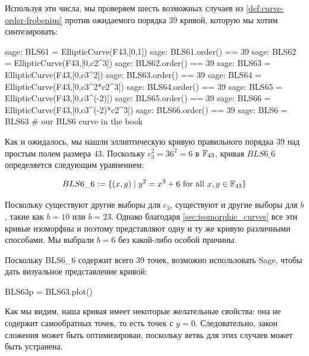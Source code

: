 Используя эти числа, мы проверяем шесть возможных случаев из \ref{def:curve-order-frobenius} против ожидаемого порядка $39$ кривой, которую мы хотим синтезировать:

\begin{sagecommandline}
sage: BLS61 = EllipticCurve(F43,[0,1])
sage: BLS61.order() == 39
sage: BLS62 = EllipticCurve(F43,[0,c2^3])
sage: BLS62.order() == 39
sage: BLS63 = EllipticCurve(F43,[0,c3^2])
sage: BLS63.order() == 39
sage: BLS64 = EllipticCurve(F43,[0,c3^2*c2^3])
sage: BLS64.order() == 39
sage: BLS65 = EllipticCurve(F43,[0,c3^(-2)])
sage: BLS65.order() == 39
sage: BLS66 = EllipticCurve(F43,[0,c3^(-2)*c2^3])
sage: BLS66.order() == 39
sage: BLS6 = BLS63 # our BLS6 curve in the book
\end{sagecommandline}
Как и ожидалось, мы нашли эллиптическую кривую правильного порядка $39$ над простым полем размера $43$. Поскольку $c_3^2=36^2=6$ в $\mathbb{F}_{43}$, кривая $BLS6\_6$ определяется следующим уравнением:

\begin{equation}
BLS6\_6 := \{(x,y)\;|\; y^2 = x^3 + 6 \text{ for all } x,y \in \mathbb{F}_{43}\}
\end{equation}

Поскольку существуют другие выборы для $c_3$, существуют и другие выборы для $b$, такие как $b=10$ или $b=23$. Однако благодаря \ref{sec:isomorphic_curves} все эти кривые изоморфны и поэтому представляют одну и ту же кривую различными способами. Мы выбрали $b=6$ без какой-либо особой причины.

Поскольку BLS6\_6 содержит всего $39$ точек, возможно использовать Sage, чтобы дать визуальное представление кривой:

\begin{sagesilent}
BLS63p = BLS63.plot()
\end{sagesilent}
\begin{center} 
\end{center}

Как мы видим, наша кривая имеет некоторые желательные свойства: она не содержит самообратных точек, то есть точек с $y=0$. Следовательно, закон сложения может быть оптимизирован, поскольку ветвь для этих случаев может быть устранена. 

